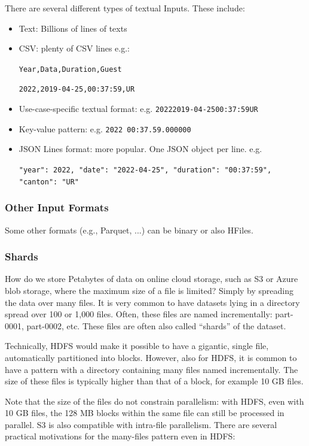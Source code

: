 There are several different types of textual Inputs. These include:

\begin{itemize}
    \item Text: Billions of lines of texts
    \item CSV: plenty of CSV lines e.g.:
    
         \texttt{Year,Data,Duration,Guest}

         \texttt{2022,2019-04-25,00:37:59,UR}
    \item Use-case-specific textual format: e.g. \texttt{20222019-04-2500:37:59UR}
    \item Key-value pattern: e.g. \texttt{2022  00:37.59.000000}
    \item JSON Lines format: more popular. One JSON object per line. e.g.
    
    \texttt{\textbraceleft "year": 2022, "date": "2022-04-25", "duration": "00:37:59", "canton": "UR"\textbraceright}
\end{itemize}

\subsubsection{Other Input Formats}
Some other formats (e.g., Parquet, ...) can be binary or also HFiles.

\subsubsection{Shards}
How do we store Petabytes of data on online cloud storage, such as S3 or Azure blob storage, where the maximum size of a file is limited? Simply by spreading the data over many files. It is very common to have datasets lying in a directory spread over 100 or 1,000 files. Often, these files are named incrementally: part-0001, part-0002, etc. These files are often also called “shards” of the dataset.

Technically, HDFS would make it possible to have a gigantic, single file, automatically partitioned into blocks. However, also for HDFS, it is common to have a pattern with a directory containing many files named incrementally. The size of these files is typically higher than that of a block, for example 10 GB files.

Note that the size of the files do not constrain parallelism: with HDFS, even with 10 GB files, the 128 MB blocks within the same file can still be processed in parallel. S3 is also compatible with intra-file parallelism. There are several practical motivations for the many-files pattern even in HDFS:

